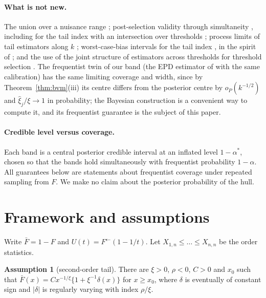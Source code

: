 \documentclass[11pt]{article}
\theoremstyle{definition}
\newtheorem{assumption}{Assumption}
\theoremstyle{remark}
\numberwithin{equation}{section}
\begin{document}
\paragraph{What is not new.} The union over a nuisance range \citep{bergerboos1994,silvapulle1996}; post-selection validity through simultaneity \citep{berk2013,armstrongkolesar2018snoop}, including for the tail index with an intersection over thresholds \citep[eq.~15]{sasakiwang2024}; process limits of tail estimators along $k$ \citep{drees1998,ddhr2000}; worst-case-bias intervals for the tail index \citep{sasakiwang2024}, in the spirit of \citet{armstrongkolesar2018,armstrongkolesar2020}; and the use of the joint structure of estimators across thresholds for threshold selection \citep{wadsworth2016,northropcoleman2014,murphy2025}. The frequentist twin of our band (the EPD estimator of \citealp{bjs2009} with the same calibration) has the same limiting coverage and width, since by Theorem~\ref{thm:bvm}(iii) its centre differs from the posterior centre by $o_P(k^{-1/2})$ and $\hat\xi_j/\xi\to1$ in probability; the Bayesian construction is a convenient way to compute it, and its frequentist guarantee is the subject of this paper.

\paragraph{Credible level versus coverage.} Each band is a central posterior credible interval at an inflated level $1-\alpha^*$, chosen so that the bands hold simultaneously with frequentist probability $1-\alpha$. All guarantees below are statements about frequentist coverage under repeated sampling from $F$. We make no claim about the posterior probability of the hull.

\section{Framework and assumptions}\label{sec:framework}

Write $\bar F=1-F$ and $U(t)=F^{\leftarrow}(1-1/t)$. Let $X_{1,n}\le\dots\le X_{n,n}$ be the order statistics.

\begin{assumption}[second-order tail]\label{ass:A1}
There are $\xi>0$, $\rho<0$, $C>0$ and $x_0$ such that $\bar F(x)=Cx^{-1/\xi}\{1+\xi^{-1}\delta(x)\}$ for $x\ge x_0$, where $\delta$ is eventually of constant sign and $|\delta|$ is regularly varying with index $\rho/\xi$.
\end{assumption}
\end{document}
